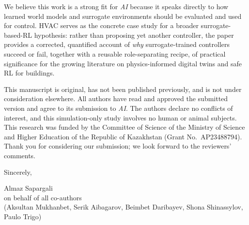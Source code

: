 \documentclass[11pt,a4paper]{article}
\begin{document}
We believe this work is a strong fit for \textit{AI} because it speaks directly to
how learned world models and surrogate environments should be evaluated and used
for control. HVAC serves as the concrete case study for a broader
surrogate-based-RL hypothesis: rather than proposing yet another controller, the
paper provides a corrected, quantified account of \emph{why} surrogate-trained
controllers succeed or fail, together with a reusable role-separating recipe, of
practical significance for the growing literature on physics-informed digital twins
and safe RL for buildings.

This manuscript is original, has not been published previously, and is not under
consideration elsewhere. All authors have read and approved the submitted version
and agree to its submission to \textit{AI}. The authors declare no conflicts of
interest, and this simulation-only study involves no human or animal subjects. This
research was funded by the Committee of Science of the Ministry of Science and
Higher Education of the Republic of Kazakhstan (Grant No.~AP23488794). Thank you for
considering our submission; we look forward to the reviewers' comments.

\vspace{1.2em}
\noindent Sincerely,

\vspace{0.4em}
\noindent
Almaz Sapargali\\
on behalf of all co-authors\\
(Aksultan Mukhanbet, Serik Aibagarov, Beimbet Daribayev, Shona Shinassylov, Paulo Trigo)
\end{document}
